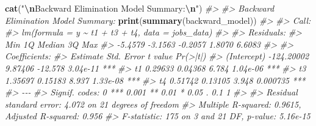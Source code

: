 \documentclass[
]{article}
\newenvironment{Shaded}{\begin{snugshade}}{\end{snugshade}}
\newcommand{\CommentTok}[1]{\textcolor[rgb]{0.56,0.35,0.01}{\textit{#1}}}
\newcommand{\FunctionTok}[1]{\textcolor[rgb]{0.13,0.29,0.53}{\textbf{#1}}}
\newcommand{\NormalTok}[1]{#1}
\newcommand{\SpecialCharTok}[1]{\textcolor[rgb]{0.81,0.36,0.00}{\textbf{#1}}}
\newcommand{\StringTok}[1]{\textcolor[rgb]{0.31,0.60,0.02}{#1}}
\begin{document}
\begin{Shaded}
\begin{Highlighting}[]
\FunctionTok{cat}\NormalTok{(}\StringTok{"}\SpecialCharTok{\textbackslash{}n}\StringTok{Backward Elimination Model Summary:}\SpecialCharTok{\textbackslash{}n}\StringTok{"}\NormalTok{)}
\CommentTok{\#\textgreater{} }
\CommentTok{\#\textgreater{} Backward Elimination Model Summary:}
\FunctionTok{print}\NormalTok{(}\FunctionTok{summary}\NormalTok{(backward\_model))}
\CommentTok{\#\textgreater{} }
\CommentTok{\#\textgreater{} Call:}
\CommentTok{\#\textgreater{} lm(formula = y \textasciitilde{} t1 + t3 + t4, data = jobs\_data)}
\CommentTok{\#\textgreater{} }
\CommentTok{\#\textgreater{} Residuals:}
\CommentTok{\#\textgreater{}     Min      1Q  Median      3Q     Max }
\CommentTok{\#\textgreater{} {-}5.4579 {-}3.1563 {-}0.2057  1.8070  6.6083 }
\CommentTok{\#\textgreater{} }
\CommentTok{\#\textgreater{} Coefficients:}
\CommentTok{\#\textgreater{}               Estimate Std. Error t value Pr(\textgreater{}|t|)    }
\CommentTok{\#\textgreater{} (Intercept) {-}124.20002    9.87406 {-}12.578 3.04e{-}11 ***}
\CommentTok{\#\textgreater{} t1             0.29633    0.04368   6.784 1.04e{-}06 ***}
\CommentTok{\#\textgreater{} t3             1.35697    0.15183   8.937 1.33e{-}08 ***}
\CommentTok{\#\textgreater{} t4             0.51742    0.13105   3.948 0.000735 ***}
\CommentTok{\#\textgreater{} {-}{-}{-}}
\CommentTok{\#\textgreater{} Signif. codes:  0 \textquotesingle{}***\textquotesingle{} 0.001 \textquotesingle{}**\textquotesingle{} 0.01 \textquotesingle{}*\textquotesingle{} 0.05 \textquotesingle{}.\textquotesingle{} 0.1 \textquotesingle{} \textquotesingle{} 1}
\CommentTok{\#\textgreater{} }
\CommentTok{\#\textgreater{} Residual standard error: 4.072 on 21 degrees of freedom}
\CommentTok{\#\textgreater{} Multiple R{-}squared:  0.9615, Adjusted R{-}squared:  0.956 }
\CommentTok{\#\textgreater{} F{-}statistic:   175 on 3 and 21 DF,  p{-}value: 5.16e{-}15}


\end{Highlighting}
\end{Shaded}
\end{document}
